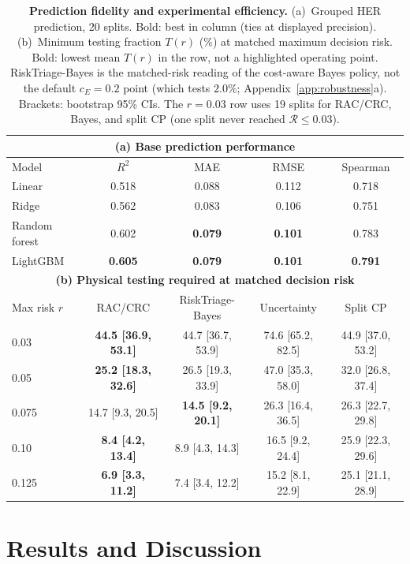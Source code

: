 \documentclass{article}
\newcommand{\risk}{\mathcal{R}}
\begin{document}
\begin{table}[t]
\centering
\caption{\textbf{Prediction fidelity and experimental efficiency.}
(a)~Grouped HER prediction, 20 splits. Bold: best in column (ties at displayed precision).
(b)~Minimum testing fraction $T(r)$ (\%) at matched maximum decision risk. Bold: lowest mean $T(r)$ in the row, not a highlighted operating point.
RiskTriage-Bayes is the matched-risk reading of the cost-aware Bayes policy, not the default $c_E=0.2$ point (which tests $2.0\%$; Appendix~\ref{app:robustness}a).
Brackets: bootstrap 95\% CIs.
The $r=0.03$ row uses 19 splits for RAC/CRC, Bayes, and split CP (one split never reached $\risk\le 0.03$).}
\label{tab:main}
\scriptsize
\renewcommand{\arraystretch}{0.92}
\setlength{\tabcolsep}{3pt}
\begin{tabular}{lcccc}
\toprule
\multicolumn{5}{c}{\textbf{(a) Base prediction performance}}\\
\midrule
Model & $R^2$ & MAE & RMSE & Spearman\\
\midrule
Linear & 0.518 & 0.088 & 0.112 & 0.718\\
Ridge & 0.562 & 0.083 & 0.106 & 0.751\\
Random forest & 0.602 & \textbf{0.079} & \textbf{0.101} & 0.783\\
LightGBM & \textbf{0.605} & \textbf{0.079} & \textbf{0.101} & \textbf{0.791}\\
\midrule
\multicolumn{5}{c}{\textbf{(b) Physical testing required at matched decision risk}}\\
\midrule
Max risk $r$ & RAC/CRC & RiskTriage-Bayes & Uncertainty & Split CP\\
\midrule
0.03 &
\textbf{44.5 [36.9, 53.1]} &
44.7 [36.7, 53.9] &
74.6 [65.2, 82.5] &
44.9 [37.0, 53.2]\\
0.05 &
\textbf{25.2 [18.3, 32.6]} &
26.5 [19.3, 33.9] &
47.0 [35.3, 58.0] &
32.0 [26.8, 37.4]\\
0.075 &
14.7 [9.3, 20.5] &
\textbf{14.5 [9.2, 20.1]} &
26.3 [16.4, 36.5] &
26.3 [22.7, 29.8]\\
0.10 &
\textbf{8.4 [4.2, 13.4]} &
8.9 [4.3, 14.3] &
16.5 [9.2, 24.4] &
25.9 [22.3, 29.6]\\
0.125 &
\textbf{6.9 [3.3, 11.2]} &
7.4 [3.4, 12.2] &
15.2 [8.1, 22.9] &
25.1 [21.1, 28.9]\\
\bottomrule
\end{tabular}
\end{table}

\section{Results and Discussion}
\end{document}
